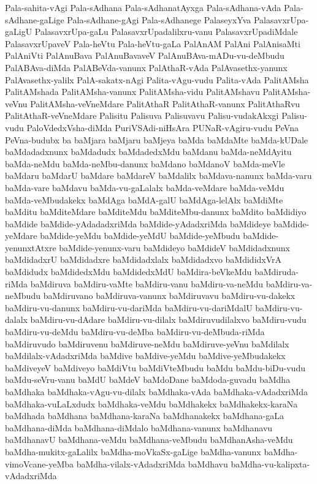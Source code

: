 {Pala-sahita-vAgi
Pala-sAdhana
Pala-sAdhanatAyxga
Pala-sAdhana-vAda
Pala-sAdhane-gaLige
Pala-sAdhane-gAgi
Pala-sAdhanege
PalaseyxYva
PalasavxrUpa-gaLigU
PalasavxrUpa-gaLu
PalasavxrUpadalilxru-vanu
PalasavxrUpadiMdale
PalasavxrUpaveV
Pala-heVtu
Pala-heVtu-gaLa
PalAnAM
PalAni
PalAnisaMti
PalAniVti
PalAnuBava
PalAnuBavaveV
PalAnuBAva-mADu-vu-deMbudu
PalABAva-diMda
PalABeVda-vanunx
PalAthaR-vAda
PalAvasethx-yanunx
PalAvasethx-yalilx
PalA-sakatx-nAgi
Palita-vAgu-vudu
Palita-vAda
PalitAMsha
PalitAMshada
PalitAMsha-vanunx
PalitAMsha-vidu
PalitAMshavu
PalitAMsha-veVnu
PalitAMsha-veVneMdare
PalitAthaR
PalitAthaR-vanunx
PalitAthaRvu
PalitAthaR-veVneMdare
Palisitu
Palisuva
Palisuvavu
Palisu-vudakAkxgi
Palisu-vudu
PaloVdedxVsha-diMda
PuriVSAdi-niHsAra
PUNaR-vAgiru-vudu
PeVna
PeVna-budubx
ba
baMjara
baMjaru
baMjeya
baMda
baMdaMte
baMda-kUDale
baMdadadxnunx
baMdadudx
baMdadedxMdu
baMdanu
baMda-neMdAyitu
baMda-neMdu
baMda-neMbu-danunx
baMdano
baMdanoV
baMda-meVle
baMdaru
baMdarU
baMdare
baMdareV
baMdalilx
baMdava-nanunx
baMda-varu
baMda-vare
baMdavu
baMda-vu-gaLalalx
baMda-veMdare
baMda-veMdu
baMda-veMbudakekx
baMdAga
baMdA-galU
baMdAga-lelAlx
baMdiMte
baMditu
baMditeMdare
baMditeMdu
baMditeMbu-danunx
baMdito
baMdidiyo
baMdide
baMdide-yAdadadxriMda
baMdide-yAdadxriMda
baMdideye
baMdide-yeMdare
baMdide-yeMdu
baMdide-yeMdU
baMdide-yeMbudu
baMdide-yenunxtAtxre
baMdide-yenunx-varu
baMdideyo
baMdideV
baMdidadxnunx
baMdidadxrU
baMdidadxre
baMdidadxlalx
baMdidadxvo
baMdididxVrA
baMdidudx
baMdidedxMdu
baMdidedxMdU
baMdira-beVkeMdu
baMdiruda-riMda
baMdiruva
baMdiru-vaMte
baMdiru-vanu
baMdiru-va-neMdu
baMdiru-va-neMbudu
baMdiruvano
baMdiruva-vanunx
baMdiruvavu
baMdiru-vu-dakekx
baMdiru-vu-danunx
baMdiru-vu-dariMda
baMdiru-vu-dariMdalU
baMdiru-vu-dalalx
baMdiru-vu-dAdare
baMdiru-vu-dilalx
baMdiruvudilalxvo
baMdiru-vudu
baMdiru-vu-deMdu
baMdiru-vu-deMba
baMdiru-vu-deMbuda-riMda
baMdiruvudo
baMdiruvenu
baMdiruve-neMdu
baMdiruve-yeVnu
baMdilalx
baMdilalx-vAdadxriMda
baMdive
baMdive-yeMdu
baMdive-yeMbudakekx
baMdiveyeV
baMdiveyo
baMdiVtu
baMdiVteMbudu
baMdu
baMdu-biDu-vudu
baMdu-seVru-vanu
baMdU
baMdeV
baMdoDane
baMdoda-guvadu
baMdha
baMdhaka
baMdhaka-vAgu-vu-dilalx
baMdhaka-vAda
baMdhaka-vAdadxriMda
baMdhaka-vuLaLxdudx
baMdhaka-veMdu
baMdhakekx
baMdhakekx-karaNa
baMdhada
baMdhana
baMdhana-karaNa
baMdhanakekx
baMdhana-gaLa
baMdhana-diMda
baMdhana-diMdalo
baMdhana-vanunx
baMdhanavu
baMdhanavU
baMdhana-veMdu
baMdhana-veMbudu
baMdhanAsha-veMdu
baMdha-mukitx-gaLalilx
baMdha-moVkaSx-gaLige
baMdha-vanunx
baMdha-vimoVcane-yeMba
baMdha-vilalx-vAdadxriMda
baMdhavu
baMdha-vu-kalipxta-vAdadxriMda
}
